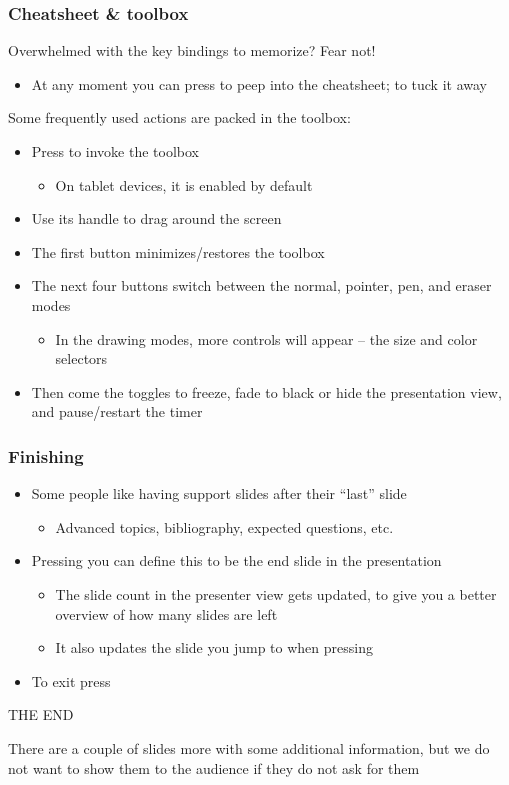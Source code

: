 \documentclass{beamer}
\newcommand{\singleitem}[1]{\begin{itemize}\item #1\end{itemize}}
\begin{document}
\begin{frame}
  \frametitle{Cheatsheet \& toolbox}
  Overwhelmed with the key bindings to memorize? Fear not!

  \singleitem{At any moment you can press  to peep into the cheatsheet;
    \keys{esc} to tuck it away}

  Some frequently used actions are packed in the toolbox:

  \begin{itemize}
    \item Press  to invoke the toolbox
      \singleitem{On tablet devices, it is enabled by default}
    \item Use its handle to drag around the screen
    \item The first button minimizes/restores the toolbox
    \item The next four buttons switch between the normal, pointer, pen, and
      eraser modes
      \singleitem{In the drawing modes, more controls will appear -- the size
        and color selectors}
    \item Then come the toggles to freeze, fade to black or hide the
      presentation view, and pause/restart the timer
  \end{itemize}
\end{frame}

\begin{frame}
  \frametitle{Finishing}
  \begin{itemize}
    \item Some people like having support slides after their ``last'' slide
      \singleitem{Advanced topics, bibliography, expected questions, etc.}
    \item Pressing  you can define this to be the end slide
      in the presentation
      \singleitem{The slide count in the presenter view gets updated, to give
        you a better overview of how many slides are left}
      \singleitem{It also updates the slide you jump to when pressing
        \keys{End}}
    \item To exit press 
  \end{itemize}
  \vfill
  \begin{center}
    THE END
  \end{center}
  \vfill
  {\footnotesize There are a couple of slides more with some additional
    information, but we do not want to show them to the audience if they do not
    ask for them}
\end{frame}
\end{document}
